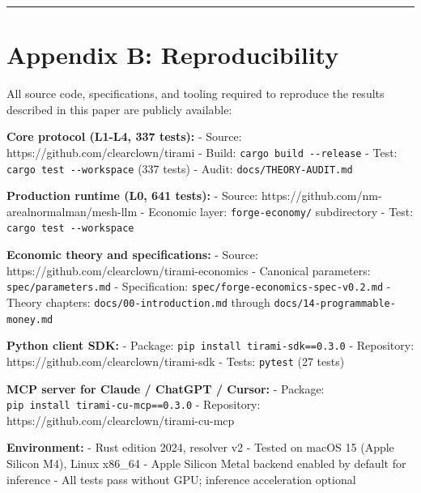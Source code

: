 \documentclass[
  11pt,
]{article}
\begin{document}
\begin{center}\rule{0.5\linewidth}{0.5pt}\end{center}

\section{Appendix B: Reproducibility}\label{appendix-b-reproducibility}

All source code, specifications, and tooling required to reproduce the
results described in this paper are publicly available:

\textbf{Core protocol (L1-L4, 337 tests):} - Source:
https://github.com/clearclown/tirami - Build:
\texttt{cargo\ build\ -\/-release} - Test:
\texttt{cargo\ test\ -\/-workspace} (337 tests) - Audit:
\texttt{docs/THEORY-AUDIT.md}

\textbf{Production runtime (L0, 641 tests):} - Source:
https://github.com/nm-arealnormalman/mesh-llm - Economic layer:
\texttt{forge-economy/} subdirectory - Test:
\texttt{cargo\ test\ -\/-workspace}

\textbf{Economic theory and specifications:} - Source:
https://github.com/clearclown/tirami-economics - Canonical parameters:
\texttt{spec/parameters.md} - Specification:
\texttt{spec/forge-economics-spec-v0.2.md} - Theory chapters:
\texttt{docs/00-introduction.md} through
\texttt{docs/14-programmable-money.md}

\textbf{Python client SDK:} - Package:
\texttt{pip\ install\ tirami-sdk==0.3.0} - Repository:
https://github.com/clearclown/tirami-sdk - Tests: \texttt{pytest} (27
tests)

\textbf{MCP server for Claude / ChatGPT / Cursor:} - Package:
\texttt{pip\ install\ tirami-cu-mcp==0.3.0} - Repository:
https://github.com/clearclown/tirami-cu-mcp

\textbf{Environment:} - Rust edition 2024, resolver v2 - Tested on macOS
15 (Apple Silicon M4), Linux x86\_64 - Apple Silicon Metal backend
enabled by default for inference - All tests pass without GPU; inference
acceleration optional
\end{document}
